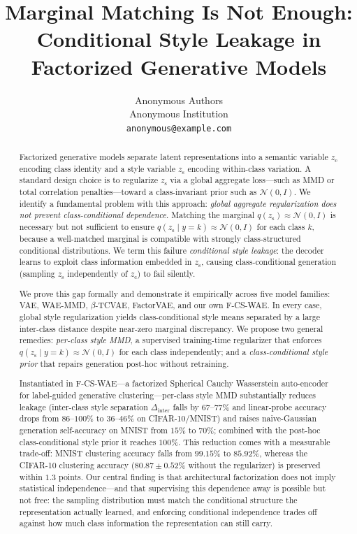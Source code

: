 \documentclass[10pt]{article}
\title{\vspace{-1.0em}
Marginal Matching Is Not Enough: \\
Conditional Style Leakage in Factorized Generative Models
\vspace{-0.3em}}
\author{
Anonymous Authors\\
\small Anonymous Institution\\
\small \texttt{anonymous@example.com}
}
\date{}
\newcommand{\zc}{z_{\mathrm{c}}}
\newcommand{\zs}{z_{\mathrm{s}}}
\begin{document}
\maketitle

\begin{abstract}
Factorized generative models separate latent representations into a semantic
variable $\zc$ encoding class identity and a style variable $\zs$ encoding
within-class variation.
A standard design choice is to regularize $\zs$ via a global aggregate loss---such
as MMD or total correlation penalties---toward a class-invariant prior such as
$\mathcal{N}(0,I)$.
We identify a fundamental problem with this approach:
\emph{global aggregate regularization does not prevent class-conditional dependence}.
Matching the marginal $q(\zs)\approx\mathcal{N}(0,I)$ is necessary but not
sufficient to ensure $q(\zs\mid y{=}k)\approx\mathcal{N}(0,I)$ for each class $k$,
because a well-matched marginal is compatible with strongly class-structured
conditional distributions.
We term this failure \emph{conditional style leakage}: the decoder learns to exploit
class information embedded in $\zs$, causing class-conditional generation (sampling
$\zs$ independently of $\zc$) to fail silently.

We prove this gap formally and demonstrate it empirically across five model families:
VAE, WAE-MMD, $\beta$-TCVAE, FactorVAE, and our own F-CS-WAE.
In every case, global style regularization yields class-conditional style means
separated by a large inter-class distance despite near-zero marginal discrepancy.
We propose two general remedies: \emph{per-class style MMD}, a supervised
training-time regularizer that enforces $q(\zs\mid y{=}k)\approx\mathcal{N}(0,I)$
for each class independently; and a \emph{class-conditional style prior} that repairs
generation post-hoc without retraining.

Instantiated in F-CS-WAE---a factorized Spherical Cauchy Wasserstein auto-encoder
for label-guided generative clustering---per-class style MMD substantially reduces
leakage (inter-class style separation $\Delta_{\mathrm{inter}}$ falls by
$67$--$77\%$ and linear-probe accuracy drops from $86$--$100\%$ to $36$--$46\%$
on CIFAR-10/MNIST) and raises naive-Gaussian generation self-accuracy on MNIST from
$15\%$ to $70\%$; combined with the post-hoc class-conditional style prior it reaches
$100\%$.
This reduction comes with a measurable trade-off: MNIST clustering accuracy falls
from $99.15\%$ to $85.92\%$, whereas the CIFAR-10 clustering accuracy
($80.87\pm0.52\%$ without the regularizer) is preserved within $1.3$ points.
Our central finding is that architectural factorization does not imply statistical
independence---and that supervising this dependence away is possible but not free:
the sampling distribution must match the conditional structure the representation
actually learned, and enforcing conditional independence trades off against how much
class information the representation can still carry.
\end{abstract}
\end{document}
